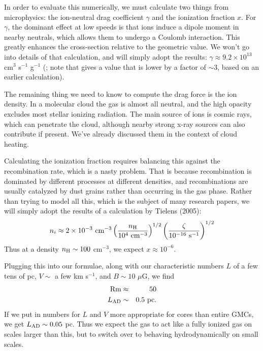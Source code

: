 In order to evaluate this numerically, we must calculate two things from microphysics: the ion-neutral drag coefficient $\gamma$ and the ionization fraction $x$. For $\gamma$, the dominant effect at low speeds is that ions induce a dipole moment in nearby neutrals, which allows them to undergo a Coulomb interaction. This greatly enhances the cross-section relative to the geometric value. We won't go into details of that calculation, and will simply adopt the results: $\gamma\approx 9.2 \times 10^{13}$ cm$^3$ s$^{-1}$ g$^{-1}$ (\citealt{smith97a}; note that \citealt{shu92a} gives a value that is lower by a factor of $\sim 3$, based on an earlier calculation).

The remaining thing we need to know to compute the drag force is the ion density. In a molecular cloud the gas is almost all neutral, and the high opacity excludes most stellar ionizing radiation. The main source of ions is cosmic rays, which can penetrate the cloud, although nearby strong x-ray sources can also contribute if present. We've already discussed them in the context of cloud heating.

Calculating the ionization fraction requires balancing this against the recombination rate, which is a nasty problem. That is because recombination is dominated by different processes at different densities, and recombinations are usually catalyzed by dust grains rather than occurring in the gas phase. Rather than trying to model all this, which is the subject of many research papers, we will simply adopt the results of a calculation by Tielens (2005):
\begin{equation}
n_i \approx 2\times 10^{-3}\mbox{ cm}^{-3} \left(\frac{n_{\rm H}}{10^4\mbox{ cm}^{-3}}\right)^{1/2} \left(\frac{\zeta}{10^{-16}\mbox{ s}^{-1}}\right)^{1/2}
\end{equation}
Thus at a density $n_{\rm H} \sim 100$ cm$^{-3}$, we expect $x\approx 10^{-6}$.

Plugging this into our formulae, along with our characteristic numbers $L$ of a few tens of pc, $V\sim$ a few km s$^{-1}$, and $B\sim 10$ $\mu$G, we find
\begin{eqnarray}
\mbox{Rm} & \approx & 50 \\
L_{\rm AD}& \sim & 0.5\mbox{ pc}.
\end{eqnarray}
If we put in numbers for $L$ and $V$ more appropriate for cores than entire GMCs, we get $L_{\rm AD} \sim 0.05$ pc. Thus we expect the gas to act like a fully ionized gas on scales larger than this, but to switch over to behaving hydrodynamically on small scales.

